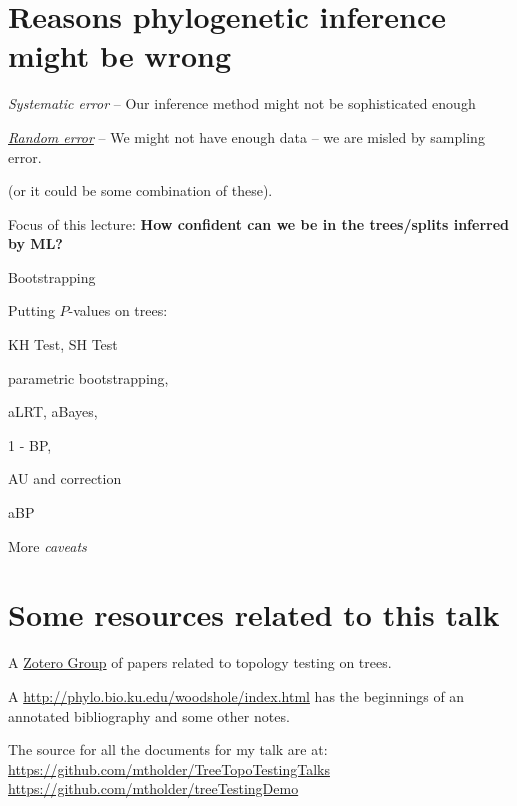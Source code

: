 

\myNewSlide
\section*{Reasons phylogenetic inference might be wrong}
\Large
\begin{compactenum}
    \item {\em Systematic error} -- Our inference method might not be sophisticated enough
    \item \underline{{\em Random error}} -- We might not have enough data --  we are misled by sampling error.
\end{compactenum}

(or it could be some combination of these).

{Focus of this lecture: {\bf How confident can we be in the trees/splits inferred by ML?}}

\myNewSlide
\begin{compactenum}
    \item Bootstrapping
    \item Putting $P$-values on trees:
    \begin{compactitem}
        \item KH Test, SH Test
        \item parametric bootstrapping,
        \item aLRT, aBayes,
        \item 1 - BP,
        \item AU and \citet{EfronHH1996} correction
        \item aBP
    \end{compactitem}
    \item More {\em caveats}
\end{compactenum}

\myNewSlide
\section*{Some resources related to this talk}
A \href{http://www.zotero.org/groups/confidence_statements_on_phylogenies}{Zotero Group} of papers related to topology testing on trees.

A \url{http://phylo.bio.ku.edu/woodshole/index.html} has the beginnings of an annotated bibliography and some other notes.

The source for all the documents for my talk are at:\\ {\normalsize \url{https://github.com/mtholder/TreeTopoTestingTalks} }\\
{\normalsize \url{https://github.com/mtholder/treeTestingDemo}}


